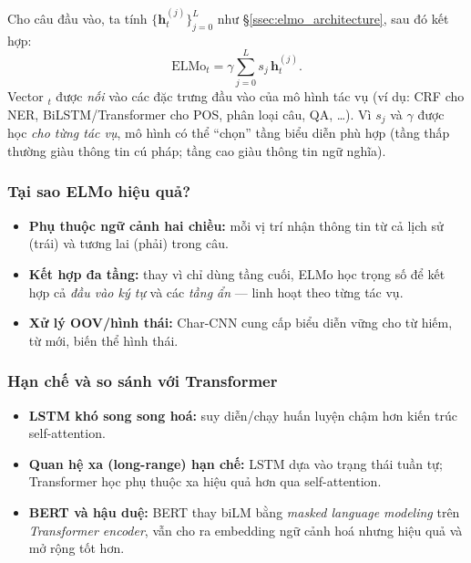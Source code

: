 Cho câu đầu vào, ta tính $\{\mathbf{h}_t^{(j)}\}_{j=0}^{L}$ như \S\ref{ssec:elmo_architecture}, sau đó kết hợp:
\[
  \text{ELMo}_t = \gamma \sum_{j=0}^{L} s_j\, \mathbf{h}_t^{(j)}.
\]
Vector $_t$ được \emph{nối} vào các đặc trưng đầu vào của mô hình tác vụ (ví dụ: CRF cho NER, BiLSTM/Transformer cho POS, phân loại câu, QA, \dots). Vì $s_j$ và $\gamma$ được học \emph{cho từng tác vụ}, mô hình có thể “chọn” tầng biểu diễn phù hợp (tầng thấp thường giàu thông tin cú pháp; tầng cao giàu thông tin ngữ nghĩa).

\subsubsection{Tại sao ELMo hiệu quả?}
\label{ssec:elmo_why}

\begin{itemize}
  \item \textbf{Phụ thuộc ngữ cảnh hai chiều:} mỗi vị trí nhận thông tin từ cả lịch sử (trái) và tương lai (phải) trong câu.
  \item \textbf{Kết hợp đa tầng:} thay vì chỉ dùng tầng cuối, ELMo học trọng số để kết hợp cả \emph{đầu vào ký tự} và các \emph{tầng ẩn} --- linh hoạt theo từng tác vụ.
  \item \textbf{Xử lý OOV/hình thái:} Char-CNN cung cấp biểu diễn vững cho từ hiếm, từ mới, biến thể hình thái.
\end{itemize}

\subsubsection{Hạn chế và so sánh với Transformer}
\label{ssec:elmo_limits}

\begin{itemize}
  \item \textbf{LSTM khó song song hoá:} suy diễn/chạy huấn luyện chậm hơn kiến trúc self-attention.
  \item \textbf{Quan hệ xa (long-range) hạn chế:} LSTM dựa vào trạng thái tuần tự; Transformer học phụ thuộc xa hiệu quả hơn qua self-attention.
  \item \textbf{BERT và hậu duệ:} BERT thay biLM bằng \emph{masked language modeling} trên \emph{Transformer encoder}, vẫn cho ra embedding ngữ cảnh hoá nhưng hiệu quả và mở rộng tốt hơn.
\end{itemize}

